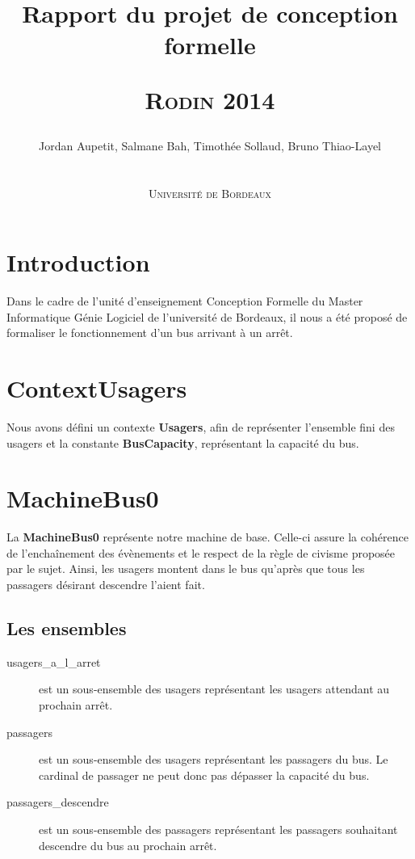 \documentclass[a4paper,titlepage]{report}
\title{Rapport du projet de conception formelle
	\begin{center}
		\textsc{Rodin 2014}
	\end{center}
}
\author{Jordan Aupetit, Salmane Bah, Timothée Sollaud, Bruno Thiao-Layel\\
	\\
	\\ \textsc{Université de Bordeaux}
}
\begin{document}
	\maketitle
	\tableofcontents
	\newpage
	\thispagestyle{empty}	
	\newpage
\markboth{}{}
\section{Introduction}
	Dans le cadre de l'unité d'enseignement Conception Formelle du Master Informatique Génie Logiciel de l'université de Bordeaux, il nous a été proposé de formaliser le fonctionnement d'un bus arrivant à un arrêt.



\section{ContextUsagers}
	Nous avons défini un contexte \textbf{Usagers}, afin de représenter l'ensemble fini des usagers et la constante \textbf{BusCapacity}, représentant la capacité du bus.\\

\section{MachineBus0}
	La \textbf{MachineBus0} représente notre machine de base. Celle-ci assure la cohérence de l'enchaînement des évènements et le respect de la règle de civisme proposée par le sujet. Ainsi, les usagers montent dans le bus qu'après que tous les passagers désirant descendre l'aient fait.\\
	
	\subsection{Les ensembles}
		\begin{description}
			\item[usagers\_a\_l\_arret] est un sous-ensemble des usagers représentant les usagers attendant au prochain arrêt.\\
			\item[passagers] est un sous-ensemble des usagers représentant les passagers du bus. Le cardinal de passager ne peut donc pas dépasser la capacité du bus.\\
			\item[passagers\_descendre] est un sous-ensemble des passagers représentant les passagers souhaitant descendre du bus au prochain arrêt.\\
		\end{description}
		
\end{document}
